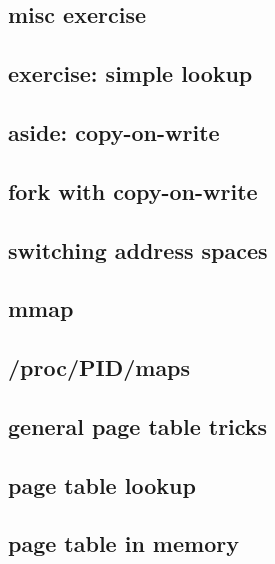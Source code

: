 \subsection{misc exercise}


\subsection{exercise: simple lookup}


\subsection{aside: copy-on-write}


\subsection{fork with copy-on-write}


\subsection{switching address spaces}


\subsection{mmap}


\subsection{/proc/PID/maps}



\subsection{general page table tricks}


\subsection{page table lookup}


\subsection{page table in memory}




